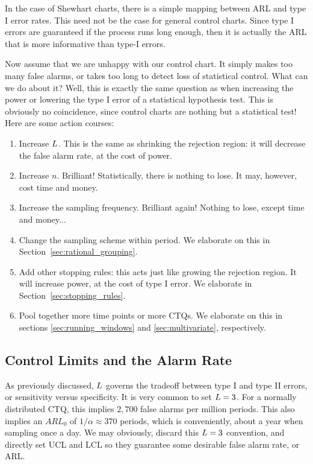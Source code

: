 \begin{remark}
In the case of Shewhart charts, there is a simple mapping between ARL and type I error rates.
This need not be the case for general control charts. 
Since type I errors are guaranteed if the process runs long enough, then it is actually the ARL that is more informative than type-I errors.
\end{remark}


Now assume that we are unhappy with our control chart. 
It simply makes too many false alarms, or takes too long to detect loss of statistical control.
What can we do about it?
Well, this is exactly the same question as when increasing the power or lowering the type I error of a statistical hypothesis test. This is obviously no coincidence, since control charts are nothing but a statistical test!
Here are some action courses:
\begin{enumerate}
\item Increase $L$. This is the same as shrinking the rejection region: 
it will decrease the false alarm rate, at the cost of power.
\item Increase $n$. Brilliant! Statistically, there is nothing to lose. It may, however, cost time and money.
\item Increase the sampling frequency. Brilliant again! Nothing to lose, except time and money...
\item Change the sampling scheme within period. We elaborate on this in Section~\ref{sec:rational_grouping}.
\item Add other stopping rules: 
this acts just like growing the rejection region. It will increase power, at the cost of type I error. We elaborate in Section~\ref{sec:stopping_rules}.
\item Pool together more time points or more CTQs. We elaborate on this in sections \ref{sec:running_windows} and  \ref{sec:multivariate}, respectively. 
\end{enumerate}






\subsection{Control Limits and the Alarm Rate}
As previously discussed, $L$ governs the tradeoff between type I and type II errors, or sensitivity versus specificity.
It is very common to set $L=3$. 
For a normally distributed CTQ, this implies $2,700$ false alarms per million periods. 
This also implies an $ARL_0$ of $1/\alpha \approx 370$ periods, which is conveniently, about a year when sampling once a day.
We may obviously, discard this $L=3$ convention, and directly set UCL and LCL so they guarantee some desirable false alarm rate, or ARL.

